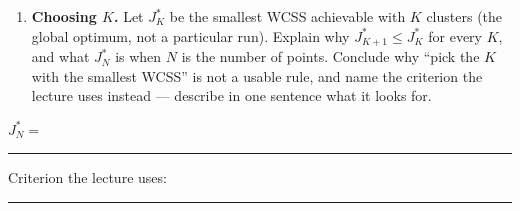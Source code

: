 \documentclass[
  11pt,
]{article}
\providecommand{\tightlist}{%
  \setlength{\itemsep}{0pt}\setlength{\parskip}{0pt}}
\newcommand{\answerspace}[1]{\par\vspace*{#1}}  %
\newcommand{\blank}[1][1.2in]{\rule{#1}{0.4pt}}
\begin{document}
\answerspace{2in}

\begin{enumerate}
\def\labelenumi{(\alph{enumi})}
\setcounter{enumi}{3}
\tightlist
\item
  \textbf{Choosing \(K\).} Let \(J^*_K\) be the smallest WCSS achievable
  with \(K\) clusters (the global optimum, not a particular run).
  Explain why \(J^*_{K+1} \le J^*_K\) for every \(K\), and what
  \(J^*_N\) is when \(N\) is the number of points. Conclude why ``pick
  the \(K\) with the smallest WCSS'' is not a usable rule, and name the
  criterion the lecture uses instead --- describe in one sentence what
  it looks for.
\end{enumerate}

\(J^*_N =\) \blank[0.8in] \qquad Criterion the lecture uses:
\blank[1.5in]

\answerspace{2.2in}
\end{document}
